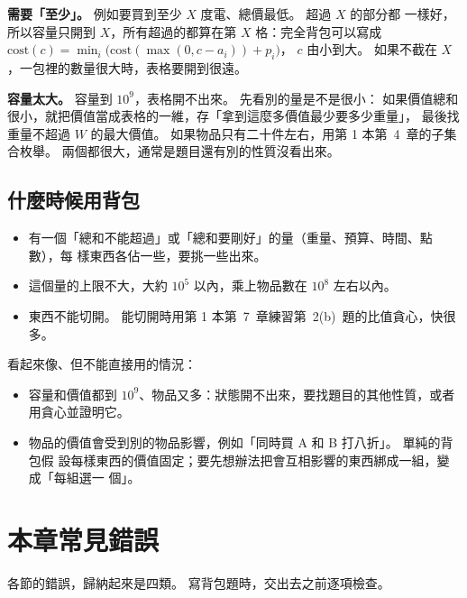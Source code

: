 \textbf{需要「至少」。} 例如要買到至少 $X$ 度電、總價最低。 超過 $X$ 的部分都
一樣好，所以容量只開到 $X$，所有超過的都算在第 $X$ 格：完全背包可以寫成
$\mathrm{cost}(c) = \min_i \bigl(\mathrm{cost}(\max(0, c - a_i)) + p_i\bigr)$，
$c$ 由小到大。 如果不截在 $X$，一包裡的數量很大時，表格要開到很遠。

\textbf{容量太大。} 容量到 $10^9$，表格開不出來。 先看別的量是不是很小：
如果價值總和很小，就把價值當成表格的一維，存「拿到這麼多價值最少要多少重量」，
最後找重量不超過 $W$ 的最大價值。 如果物品只有二十件左右，用第 1 本第~4~章的子集
合枚舉。 兩個都很大，通常是題目還有別的性質沒看出來。

\subsection{什麼時候用背包}

\begin{itemize}
\item 有一個「總和不能超過」或「總和要剛好」的量（重量、預算、時間、點數），每
樣東西各佔一些，要挑一些出來。
\item 這個量的上限不大，大約 $10^5$ 以內，乘上物品數在 $10^8$ 左右以內。
\item 東西不能切開。 能切開時用第 1 本第~7~章練習第~2(b)~題的比值貪心，快很多。
\end{itemize}

看起來像、但不能直接用的情況：

\begin{itemize}
\item 容量和價值都到 $10^9$、物品又多：狀態開不出來，要找題目的其他性質，或者
用貪心並證明它。
\item 物品的價值會受到別的物品影響，例如「同時買 A 和 B 打八折」。 單純的背包假
設每樣東西的價值固定；要先想辦法把會互相影響的東西綁成一組，變成「每組選一
個」。
\end{itemize}

\section{本章常見錯誤}
\label{sec:knap-pitfalls}

各節的錯誤，歸納起來是四類。 寫背包題時，交出去之前逐項檢查。

